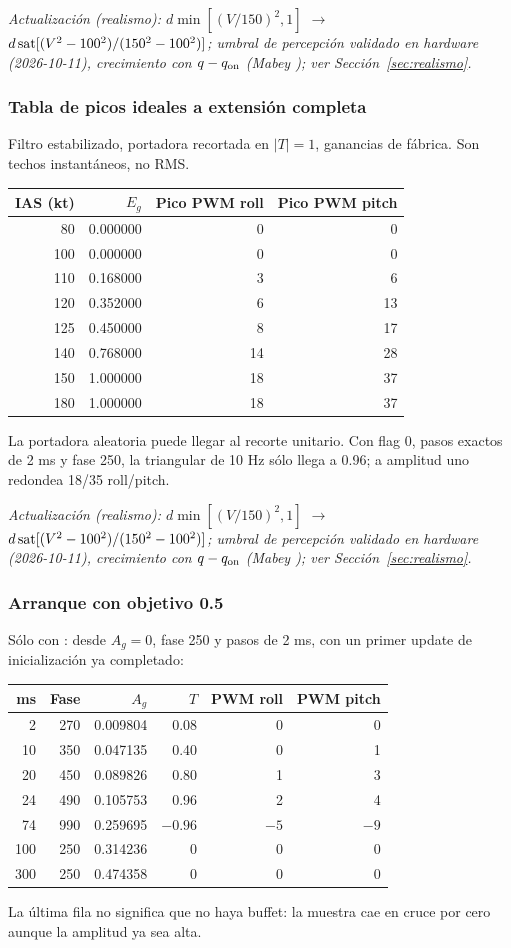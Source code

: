 \textit{Actualización (realismo): $d\min[(V/150)^2,1]$ $\rightarrow$ $d\operatorname{sat}[(V^2-100^2)/(150^2-100^2)]$; umbral de percepción validado en hardware (2026-10-11), crecimiento con $q-q_{\rm on}$ (Mabey \cite{mabey1988}); ver Sección~\ref{sec:realismo}.}

\subsubsection{Tabla de picos ideales a extensión completa}
Filtro estabilizado, portadora recortada en $|T|=1$, ganancias de fábrica. Son techos instantáneos, no RMS.
\begin{center}\begin{tabular}{rrrr}
\toprule IAS (kt)&$E_g$&Pico PWM roll&Pico PWM pitch\\\midrule
80&0.000000&0&0\\
100&0.000000&0&0\\
110&0.168000&3&6\\
120&0.352000&6&13\\
125&0.450000&8&17\\
140&0.768000&14&28\\
150&1.000000&18&37\\
180&1.000000&18&37\\
\bottomrule\end{tabular}\end{center}
La portadora aleatoria puede llegar al recorte unitario. Con flag 0, pasos exactos de 2 ms y fase 250, la triangular de 10 Hz sólo llega a 0.96; a amplitud uno redondea 18/35 roll/pitch.

\textit{Actualización (realismo): $d\min[(V/150)^2,1]$ $\rightarrow$ $d\operatorname{sat}[(V^2-100^2)/(150^2-100^2)]$; umbral de percepción validado en hardware (2026-10-11), crecimiento con $q-q_{\rm on}$ (Mabey \cite{mabey1988}); ver Sección~\ref{sec:realismo}.}

\subsubsection{Arranque con objetivo 0.5}
Sólo con : desde $A_g=0$, fase 250 y pasos de 2 ms, con un primer update de inicialización ya completado:
\begin{center}\begin{tabular}{rrrrrr}
\toprule ms&Fase&$A_g$&$T$&PWM roll&PWM pitch\\\midrule
2&270&0.009804&0.08&0&0\\10&350&0.047135&0.40&0&1\\20&450&0.089826&0.80&1&3\\24&490&0.105753&0.96&2&4\\74&990&0.259695&$-0.96$&$-5$&$-9$\\100&250&0.314236&0&0&0\\300&250&0.474358&0&0&0\\\bottomrule
\end{tabular}\end{center}
La última fila no significa que no haya buffet: la muestra cae en cruce por cero aunque la amplitud ya sea alta.


